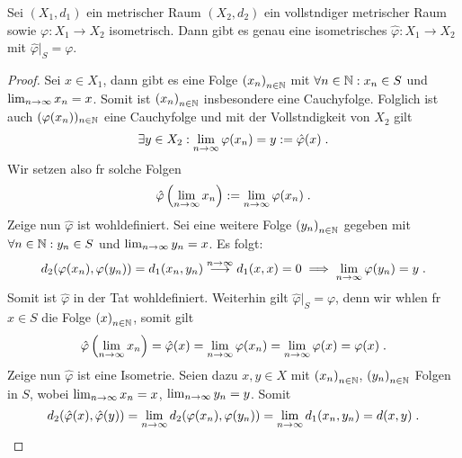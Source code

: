 \begin{theorem}
	Sei \((X_1,d_1)\) ein metrischer Raum \((X_2, d_2)\) ein vollst\as ndiger metrischer Raum sowie \(\varphi: X_1 \to X_2\) isometrisch. Dann gibt es genau eine isometrisches \(\hat\varphi: X_1\to X_2\) mit \(\hat\varphi\vert_S = \varphi\).
	\label{vollst_isometrie}
\end{theorem}
\begin{proof}
	Sei \(x\in X_1\), dann gibt es eine Folge \(\left (x_n\right )_{n\in \mathbb{N}}\) mit \(\forall n \in \mathbb{N}: x_n \in S\) und \(\lim_{n \to \infty} x_n = x\). Somit ist \(\left (x_n\right )_{n\in \mathbb{N}}\) insbesondere eine Cauchyfolge. Folglich ist auch \((\varphi(x_n))_{n\in\mathbb{N}}\) eine Cauchyfolge und mit der Vollst\as ndigkeit von $X_2$ gilt
	\[\exists y\in X_2: \lim_{n \to\infty} \varphi(x_n) = y:= \hat\varphi(x)\;.\]
	Wir setzen also f\us r solche Folgen \[\hat\varphi\left(\lim_{n \to \infty} x_n\right) := \lim_{n \to\infty} \varphi(x_n)\;.\]
	Zeige nun \(\hat \varphi\) ist wohldefiniert. Sei eine weitere Folge \(\left (y_n\right )_{n\in \mathbb{N}}\) gegeben mit \(\forall n \in \mathbb{N}: y_n \in S\) und \(\lim_{n \to \infty} y_n = x\). Es folgt:
	\[d_2(\varphi(x_n), \varphi(y_n)) = d_1(x_n, y_n) \overset{n\to\infty}{\longrightarrow} d_1(x,x) = 0 \implies \lim_{n \to\infty} \varphi(y_n) = y\;.\]
	Somit ist $\hat\varphi$ in der Tat wohldefiniert. Weiterhin gilt \(\hat\varphi\vert_S = \varphi\), denn wir w\as hlen f\us r \(x \in S\) die Folge $\left (x\right )_{n\in \mathbb{N}}$, somit gilt
	\[ \hat \varphi\left(\lim_{n \to \infty} x_n \right) = \hat\varphi(x) = \lim_{n \to\infty} \varphi(x_n) = \lim_{n \to\infty} \varphi(x) = \varphi(x)\;.\] 
	Zeige nun \(\hat\varphi\) ist eine Isometrie. Seien dazu \(x,y\in X\) mit  $\left (x_n\right )_{n\in \mathbb{N}}$, $\left (y_n\right )_{n\in \mathbb{N}}$ Folgen in $S$, wobei $\lim_{n \to \infty} x_n = x$, $\lim_{n \to \infty} y_n = y$. Somit
	\[d_2(\hat\varphi(x), \hat\varphi(y)) = \lim_{n \to\infty} d_2(\varphi(x_n), \varphi(y_n)) = \lim_{n \to\infty} d_1(x_n, y_n) = d(x,y) \;.\] 
\end{proof}


